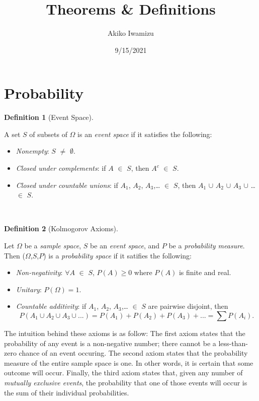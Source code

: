 \documentclass[
]{article}
\title{Theorems \& Definitions}
\author{Akiko Iwamizu}
\date{9/15/2021}
\providecommand{\tightlist}{%
  \setlength{\itemsep}{0pt}\setlength{\parskip}{0pt}}
\theoremstyle{definition}
\newtheorem{definition}{Definition}[section]
\theoremstyle{definition}
\theoremstyle{definition}
\theoremstyle{remark}
\begin{document}
\maketitle

{
\setcounter{tocdepth}{2}
\tableofcontents
}
\hypertarget{probability}{%
\section{Probability}\label{probability}}

\begin{definition}[Event Space]
\protect\hypertarget{def:unlabeled-div-1}{}\label{def:unlabeled-div-1}

A set \(S\) of subsets of \(\Omega\) is an \emph{event space} if it satisfies the following:

\begin{itemize}
\tightlist
\item
  \emph{Nonempty}: \(S\) \(\ne\) \(\emptyset\).
\item
  \emph{Closed under complements}: if \(A\) \(\in\) \(S\), then \(A^c\) \(\in\) \(S\).
\item
  \emph{Closed under countable unions}: if \(A_1\), \(A_2\), \(A_3\),\ldots{} \(\in\) \(S\), then \(A_1\) \(\cup\) \(A_2\) \(\cup\) \(A_3\) \(\cup\) \ldots{} \(\in\) \(S\).
\end{itemize}

~

\end{definition}

\begin{definition}[Kolmogorov Axioms]
\protect\hypertarget{def:unlabeled-div-2}{}\label{def:unlabeled-div-2}

Let \(\Omega\) be a \emph{sample space}, \(S\) be an \emph{event space}, and \(P\) be a \emph{probability measure}. Then (\(\Omega\),\(S\),\(P\)) is a \emph{probability space} if it satifies the following:

\begin{itemize}
\tightlist
\item
  \emph{Non-negativity}: \(\forall\)\(A\) \(\in\) \(S\), \(P(A) \ge 0\) where \(P(A)\) is finite and real.
\item
  \emph{Unitary}: \(P(\Omega) = 1\).
\item
  \emph{Countable additivity}: if \(A_1\), \(A_2\), \(A_3\),\ldots{} \(\in\) \(S\) are pairwise disjoint, then
  \[P(A_1 \cup A_2 \cup A_3 \cup ...) = P(A_1) + P(A_2) + P(A_3) +... = \sum P(A_i).\]
\end{itemize}

The intuition behind these axioms is as follow: The first axiom states that the probability of any event is a non-negative number; there cannot be a less-than-zero chance of an event occuring. The second axiom states that the probability measure of the entire sample space is one. In other words, it is certain that some outcome will occur. Finally, the third axiom states that, given any number of \emph{mutually exclusive events}, the probability that one of those events will occur is the sum of their individual probabilities.

~

\end{definition}
\end{document}
